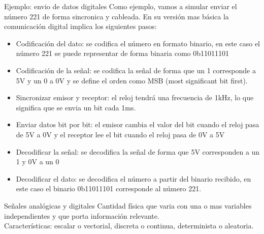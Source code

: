 \documentclass[aspectratio=169]{beamer}
\begin{document}
\begin{frame}{Ejemplo: envio de datos digitales}
Como ejemplo, vamos a simular enviar el número 221 de forma sincronica y cableada. En su versión mas básica la comunicación digital implica los siguientes pasos:
{\footnotesize
\begin{itemize}
    \item Codificación del dato: se codifica el número en formato binario, en este caso el número 221 se puede representar de forma binaria como 0b11011101
    \item Codificación de la señal: se codifica la señal de forma que un 1 corresponde a 5V y un 0 a 0V y se define el orden como MSB (most significant bit first).
    \item Sincronizar emisor y receptor: el reloj tendrá una frecuencia de 1kHz, lo que significa que se envia un bit cada 1ms.
    \item Enviar datos bit por bit: el emisor cambia el valor del bit cuando el reloj pasa de 5V a 0V y el receptor lee el bit cuando el reloj pasa de 0V a 5V
    \item Decodificar la señal: se decodifica la señal de forma que 5V corresponden a un 1 y 0V a un 0
    \item Decodificar el dato: se decodifica el número a partir del binario recibido, en este caso el binario 0b11011101 corresponde al número 221.
\end{itemize}
}
\end{frame}




\begin{frame}[t]{Señales analógicas y digitales}
Cantidad física que varia con una o mas variables independientes y que porta información relevante.\\[8pt]
Características: escalar o vectorial, discreta o continua, determinista o aleatoria.\par

\end{frame}
\end{document}
